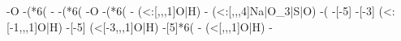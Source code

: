 \begin{struct}
{                                                                                                                    -O
                                                                                                                    -(*6(
                                                                                                                        -
                                                                                                                        -(*6(
                                                                                                                            -O
                                                                                                                            -(*6(
                                                                                                                                -
                                                                                                                                    (<:[,,,1]O|H)
                                                                                                                                -
                                                                                                                                    (<:[,,,4]Na|O_3|S|O)
                                                                                                                                -(
                                                                                                                                    -[-5]
                                                                                                                                    -[-3]
                                                                                                                                        (<:[-1,,,1]O|H)
                                                                                                                                    -[-5]
                                                                                                                                        (<[-3,,,1]O|H)
                                                                                                                                    -[5]*6(
                                                                                                                                        -
                                                                                                                                            (<[,,,1]O|H)
                                                                                                                                        -
}
\end{struct}
